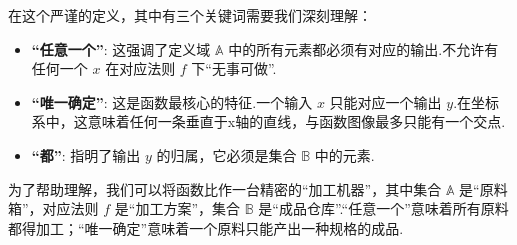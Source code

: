 \begin{note}[对定义的解读]
	在这个严谨的定义，其中有三个关键词需要我们深刻理解：
	\begin{itemize}
		\item \textbf{“任意一个”}: 这强调了定义域 $\mathbb{A}$ 中的所有元素都必须有对应的输出.不允许有任何一个 $x$ 在对应法则 $f$ 下“无事可做”.
		\item \textbf{“唯一确定”}: 这是函数最核心的特征.一个输入 $x$ 只能对应一个输出 $y$.在坐标系中，这意味着任何一条垂直于x轴的直线，与函数图像最多只能有一个交点.
		\item \textbf{“都”}: 指明了输出 $y$ 的归属，它必须是集合 $\mathbb{B}$ 中的元素.
	\end{itemize}
	为了帮助理解，我们可以将函数比作一台精密的“加工机器”，其中集合 $\mathbb{A}$ 是“原料箱”，对应法则 $f$ 是“加工方案”，集合 $\mathbb{B}$ 是“成品仓库”.“任意一个”意味着所有原料都得加工；“唯一确定”意味着一个原料只能产出一种规格的成品.
\end{note}

